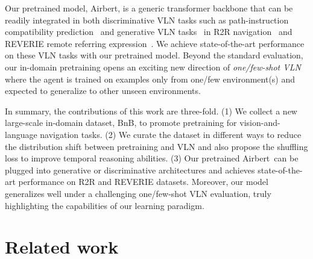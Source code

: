 \RequirePackage[dvipsnames,table]{xcolor} \documentclass[10pt,twocolumn,letterpaper]{article}
\newcommand{\airbert}{Airbert}
\newcommand{\airbnb}{BnB}
\begin{document}
Our pretrained model, \airbert, is a generic transformer backbone that can be readily integrated in both discriminative VLN tasks such as path-instruction compatibility prediction~\cite{majumdar2020vlnbert} and generative VLN tasks~\cite{hong2021recurrentvln} in R2R navigation~\cite{anderson2018r2r} and REVERIE remote referring expression~\cite{qi2020reverie}.
We achieve state-of-the-art performance on these VLN tasks with our pretrained model.
Beyond the standard evaluation, our in-domain pretraining opens an exciting new direction of \emph{one/few-shot VLN} where the agent is trained on examples only from one/few environment(s) and expected to generalize to other unseen environments.


In summary, the contributions of this work are three-fold.
(1) We collect a new large-scale in-domain dataset, \airbnb, to promote pretraining for vision-and-language navigation tasks. 
(2) We curate the dataset in different ways to reduce the distribution shift between pretraining and VLN and also propose the shuffling loss to improve temporal reasoning abilities.
(3) Our pretrained \airbert~can be plugged into generative or discriminative architectures and achieves state-of-the-art performance on R2R and REVERIE datasets.
Moreover, our model generalizes well under a challenging one/few-shot VLN evaluation, truly highlighting the capabilities of our learning paradigm.



















































 \section{Related work}
\label{sec:related}
\end{document}

